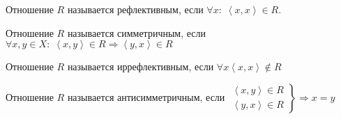 \begin{definition}
Отношение $R$ называется рефлективным, если $\forall x: \; \left<x, x\right> \in R$.
\end{definition}
\begin{definition}
    Отношение $R$ называется симметричным, если  $\forall x, y \in X: \; \left<x, y\right> \in R \Rightarrow \left<y, x\right> \in R$
\end{definition}
\begin{definition}
    Отношение $R$ называется иррефлективным, если  $\forall x \left<x,x\right> \notin R$
\end{definition}
\begin{definition}
    Отношение $R$ называется антисимметричным, если  $\left. \begin{array}{r} \left<x, y\right> \in R \\ \left<y, x\right> \in R\end{array} \right\} \Rightarrow x = y$
\end{definition}

